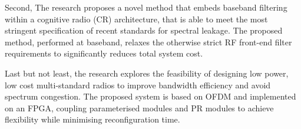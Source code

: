 Second, The research proposes a novel method that embeds baseband filtering within a cognitive radio (CR) architecture, that is able to meet the most stringent specification of recent standards for spectral leakage. The proposed method, performed at baseband, relaxes the otherwise strict RF front-end filter requirements to significantly reduces total system cost.

Last but not least, the research explores the feasibility of designing low power, low cost multi-standard radios to improve bandwidth efficiency and avoid spectrum congestion. The proposed system
is based on OFDM and implemented on an FPGA, coupling parameterised modules and PR modules to achieve flexibility while minimising reconfiguration time.